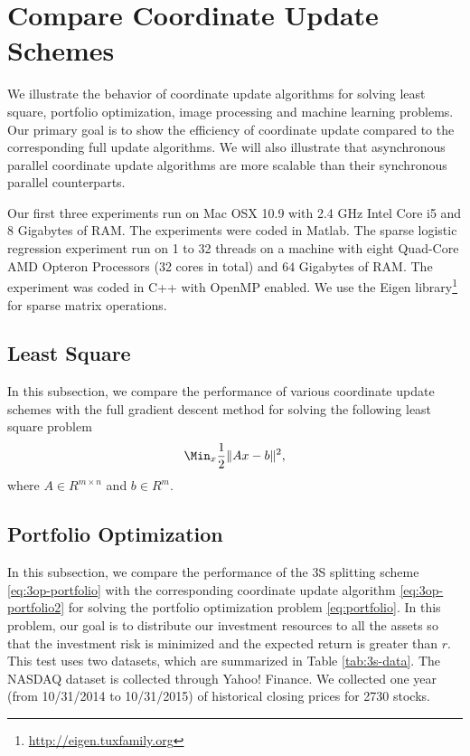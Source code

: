 \section{Compare Coordinate Update Schemes}\label{sec:numerical}
We illustrate the behavior of coordinate update algorithms for solving least square, portfolio optimization, image processing and machine learning problems. Our primary goal is to show the efficiency of coordinate update compared to the corresponding full update algorithms. We will also illustrate that asynchronous parallel coordinate update algorithms are more scalable than their synchronous parallel counterparts. 

Our first three experiments run on Mac OSX 10.9 with 2.4 GHz Intel Core i5 and 8 Gigabytes of RAM. The experiments were coded in Matlab. The sparse logistic regression experiment run on 1 to 32 threads on a machine with eight Quad-Core AMD Opteron Processors (32 cores in total) and $64$ Gigabytes of RAM. The experiment was coded in C++ with OpenMP enabled. We use the Eigen library\footnote{\url{http://eigen.tuxfamily.org}} for sparse matrix operations.

\subsection{Least Square}
In this subsection, we compare the performance of various coordinate update schemes with the full gradient descent method for solving the following least square problem
$$\Min_{x} \frac{1}{2} \|A x - b\|^2,$$
where $A \in R^{m \times n}$ and $b \in R^m$. 

\subsection{Portfolio Optimization}
In this subsection, we compare the performance of the 3S splitting scheme \eqref{eq:3op-portfolio} with the corresponding coordinate update algorithm \eqref{eq:3op-portfolio2} for solving the portfolio optimization problem \eqref{eq:portfolio}. In this problem, our goal is to distribute our investment resources to all the assets so that the investment risk is minimized and the expected return is greater than $r$. This test uses two datasets, which are summarized in Table \ref{tab:3s-data}. The NASDAQ dataset is collected through Yahoo! Finance. We collected one year (from 10/31/2014 to 10/31/2015) of historical closing prices for 2730 stocks. 

